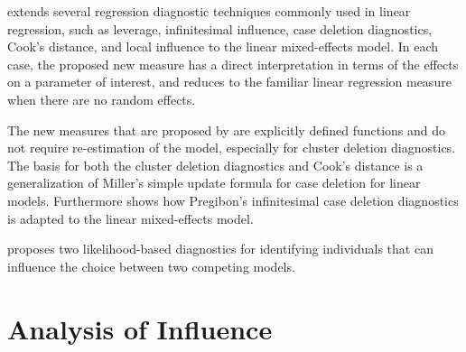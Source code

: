 \documentclass[12pt, a4paper]{article}
\begin{document}


\citet{Demi} extends several regression diagnostic techniques commonly used in linear regression, such as leverage, infinitesimal influence, case deletion diagnostics, Cook's distance, and local influence to the linear mixed-effects model. In each case, the proposed new measure has a direct interpretation in terms of the effects on a parameter of interest, and reduces to the familiar linear regression measure when there are no random effects. 

The new measures that are proposed by \citet{Demi} are explicitly defined functions and do not require re-estimation of the model, especially for cluster deletion diagnostics. The basis for both the cluster deletion diagnostics and Cook's distance is a generalization of Miller's simple update formula for case deletion for linear models. Furthermore \citet{Demi} shows how Pregibon's infinitesimal case deletion diagnostics is adapted to the linear mixed-effects model. 


%
%
%

\citet{Demi} proposes two likelihood-based diagnostics for identifying individuals that can influence the choice between two competing models.



\section{Analysis of  Influence}
\end{document}
